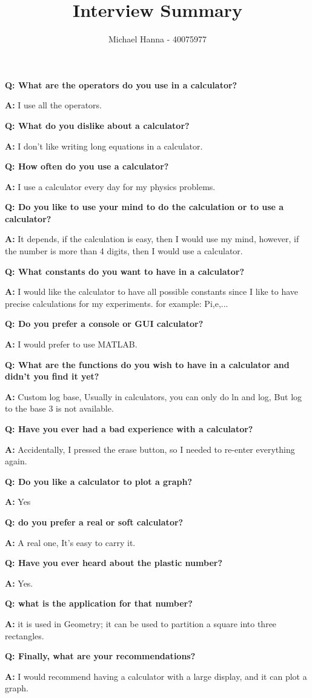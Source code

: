 \documentclass{article}
\title{Interview Summary}
\author{Michael Hanna - 40075977}
\date{}
\newenvironment{qanda}{\setlength{\parindent}{0pt}}{\bigskip}
\newcommand{\Q}{\bigskip\bfseries Q: }
\newcommand{\A}{\par\textbf{A:} \normalfont}
\begin{document}
\maketitle
\begin{qanda}
 
\Q What are the operators do you use in a calculator?
\A I use all the operators.

\Q What do you dislike about a calculator?
\A I don't like writing long equations in a calculator.

\Q  How often do you use a calculator?
\A I use a calculator every day for my physics problems.

\Q  Do you like to use your mind to do the calculation or to use a calculator?
\A It depends, if the calculation is easy, then I would use my mind, however, if the number is more than 4 digits, then I would use a calculator.

\Q What constants do you want to have in a calculator?
\A I would like the calculator to have all possible constants since I like to have precise calculations for my experiments. for example: Pi,e,...

\Q Do you prefer a console or GUI calculator?
\A I would prefer to use MATLAB. 

\Q What are the functions do you wish to have in a calculator and didn't you find it yet?
\A Custom log base, Usually in calculators, you can only do ln and log, But log to the base 3 is not available.

\Q Have you ever had a bad experience with a calculator?
\A Accidentally, I pressed the erase button, so I needed to re-enter everything again.

\Q Do you like a calculator to plot a graph?
\A Yes

\Q do you prefer a real or soft calculator?
\A A real one, It's easy to carry it.

\Q Have you ever heard about the plastic number?
\A Yes.

\Q what is the application for that number?
\A it is used in Geometry; it can be used to partition a square into three rectangles.

\Q Finally, what are your recommendations?
\A I would recommend having a calculator with a large display, and it can plot a graph.

\end{qanda}
\end{document}
